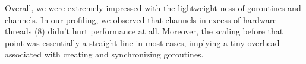 \documentclass[11pt]{article}
\begin{document}
Overall, we were extremely impressed with the lightweight-ness of goroutines and channels. In our profiling, we observed that channels in excess of hardware threads (8) didn't hurt performance at all. Moreover, the scaling before that point was essentially a straight line in most cases, implying a tiny overhead associated with creating and synchronizing goroutines. 
\end{document}
